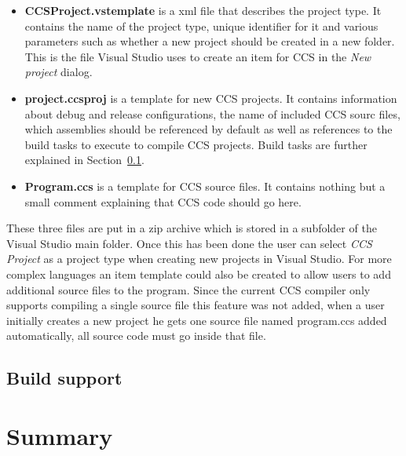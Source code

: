 	\begin{itemize}
		\item \textbf{CCSProject.vstemplate} is a xml file that describes the 
		project type. It contains the name of the project type, unique identifier 
		for it and various parameters such as whether a new project should be 
		created in a new folder. This is the file Visual Studio uses to create an 
		item for CCS in the \textit{New project} dialog.
		
		\item \textbf{project.ccsproj} is a template for new CCS projects. It 
		contains information about debug and release configurations, the name of 
		included CCS sourc files, which assemblies should be referenced by default 
		as well as references to the build tasks to execute to compile CCS 
		projects. Build tasks are further explained in Section~\ref{msbuild}.
		
		\item \textbf{Program.ccs} is a template for CCS source files. It contains
		nothing but a small comment explaining that CCS code should go here. 
	
	\end{itemize}
	
	These three files are put in a zip archive which is stored in a subfolder of
	the Visual Studio main folder. Once this has been done the user can select 
	\textit{CCS Project} as a project type when creating new projects in Visual 
	Studio. For more complex languages an item template could also be created to
	allow users to add additional source files to the program. Since the current
	CCS compiler only supports compiling a single source file this feature was 
	not added, when a user initially creates a new project he gets one source 
	file named \textsf{program.ccs} added automatically, all source code must go
	inside that file.

	\subsection{Build support}\label{msbuild}
	
	
	\section{Summary}
	